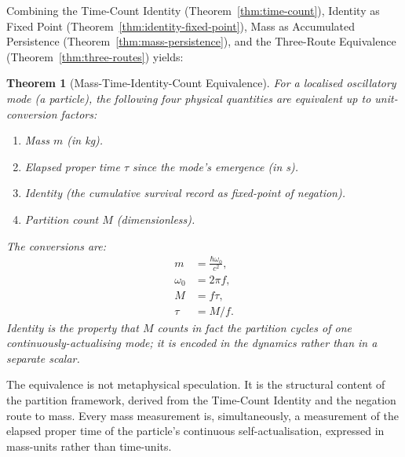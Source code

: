 \documentclass[twocolumn,10pt,a4paper]{article}
\newtheorem{theorem}{Theorem}[section]
\theoremstyle{definition}
\theoremstyle{remark}
\newcommand{\Mcount}{M}
\begin{document}
Combining the Time-Count Identity (Theorem~\ref{thm:time-count}), Identity as Fixed Point (Theorem~\ref{thm:identity-fixed-point}), Mass as Accumulated Persistence (Theorem~\ref{thm:mass-persistence}), and the Three-Route Equivalence (Theorem~\ref{thm:three-routes}) yields:

\begin{theorem}[Mass-Time-Identity-Count Equivalence]
\label{thm:equivalence}
For a localised oscillatory mode (a particle), the following four physical quantities are equivalent up to unit-conversion factors:
\begin{enumerate}[leftmargin=1.5em,itemsep=0.2em]
    \item Mass $m$ (in kg).
    \item Elapsed proper time $\tau$ since the mode's emergence (in s).
    \item Identity (the cumulative survival record as fixed-point of negation).
    \item Partition count $\Mcount$ (dimensionless).
\end{enumerate}
The conversions are:
\begin{align}
    m &= \frac{\hbar \omega_0}{c^2}, \\
    \omega_0 &= 2\pi f, \\
    \Mcount &= f \tau, \\
    \tau &= \Mcount / f.
\end{align}
Identity is the property that $\Mcount$ counts in fact the partition cycles of one continuously-actualising mode; it is encoded in the dynamics rather than in a separate scalar.
\end{theorem}

The equivalence is not metaphysical speculation. It is the structural content of the partition framework, derived from the Time-Count Identity and the negation route to mass. Every mass measurement is, simultaneously, a measurement of the elapsed proper time of the particle's continuous self-actualisation, expressed in mass-units rather than time-units.
\end{document}
